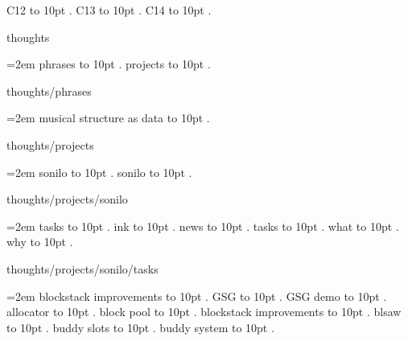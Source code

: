 \smallskip
C12 \leaders\hbox to 10pt {\hss.\hss}  \hfill {}
\smallskip
C13 \leaders\hbox to 10pt {\hss.\hss}  \hfill {}
\smallskip
C14 \leaders\hbox to 10pt {\hss.\hss}  \hfill {}
\smallskip
\par\endgroup
\bigskip
{}
thoughts
\par\begingroup
\leftskip=2em
\smallskip
phrases \leaders\hbox to 10pt {\hss.\hss}  \hfill {}
\smallskip
projects \leaders\hbox to 10pt {\hss.\hss}  \hfill {}
\smallskip
\medskip
\par\endgroup
\bigskip
{}
thoughts/phrases
\par\begingroup
\leftskip=2em
\smallskip
\medskip
musical structure as data \leaders\hbox to 10pt {\hss.\hss}  \hfill {}
\smallskip
\par\endgroup
\bigskip
{}
thoughts/projects
\par\begingroup
\leftskip=2em
\smallskip
sonilo \leaders\hbox to 10pt {\hss.\hss}  \hfill {}
\smallskip
\medskip
sonilo \leaders\hbox to 10pt {\hss.\hss}  \hfill {}
\smallskip
\par\endgroup
\bigskip
{}
thoughts/projects/sonilo
\par\begingroup
\leftskip=2em
\smallskip
tasks \leaders\hbox to 10pt {\hss.\hss}  \hfill {}
\smallskip
\medskip
ink \leaders\hbox to 10pt {\hss.\hss}  \hfill {}
\smallskip
news \leaders\hbox to 10pt {\hss.\hss}  \hfill {}
\smallskip
tasks \leaders\hbox to 10pt {\hss.\hss}  \hfill {}
\smallskip
what \leaders\hbox to 10pt {\hss.\hss}  \hfill {}
\smallskip
why \leaders\hbox to 10pt {\hss.\hss}  \hfill {}
\smallskip
\par\endgroup
\bigskip
{}
thoughts/projects/sonilo/tasks
\par\begingroup
\leftskip=2em
\smallskip
blockstack improvements \leaders\hbox to 10pt {\hss.\hss}  \hfill {}
\smallskip
\medskip
GSG \leaders\hbox to 10pt {\hss.\hss}  \hfill {}
\smallskip
GSG demo \leaders\hbox to 10pt {\hss.\hss}  \hfill {}
\smallskip
allocator \leaders\hbox to 10pt {\hss.\hss}  \hfill {}
\smallskip
block pool \leaders\hbox to 10pt {\hss.\hss}  \hfill {}
\smallskip
blockstack improvements \leaders\hbox to 10pt {\hss.\hss}  \hfill {}
\smallskip
blsaw \leaders\hbox to 10pt {\hss.\hss}  \hfill {}
\smallskip
buddy slots \leaders\hbox to 10pt {\hss.\hss}  \hfill {}
\smallskip
buddy system \leaders\hbox to 10pt {\hss.\hss}  \hfill {}
